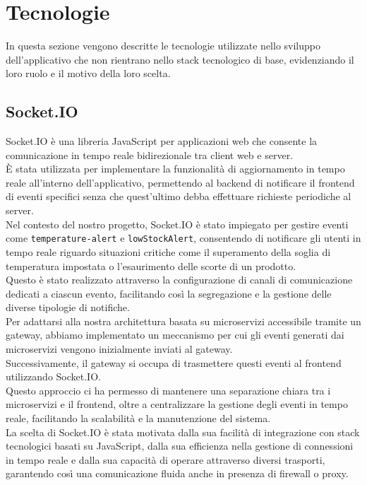 \section{Tecnologie}

In questa sezione vengono descritte le tecnologie utilizzate nello sviluppo dell'applicativo che non rientrano nello stack tecnologico di base, evidenziando il loro ruolo e il motivo della loro scelta.

\subsection{Socket.IO}
Socket.IO\cite{socketio} è una libreria JavaScript per applicazioni web che consente la comunicazione in tempo reale bidirezionale tra client web e server.\\
È stata utilizzata per implementare la funzionalità di aggiornamento in tempo reale all'interno dell'applicativo, permettendo al backend
di notificare il frontend di eventi specifici senza che quest'ultimo debba effettuare richieste periodiche al server.\\
Nel contesto del nostro progetto, Socket.IO è stato impiegato per gestire eventi come \texttt{temperature-alert} e \texttt{lowStockAlert},
consentendo di notificare gli utenti in tempo reale riguardo situazioni critiche come il superamento della soglia di temperatura impostata o l'esaurimento delle scorte di un prodotto.\\
Questo è stato realizzato attraverso la configurazione di canali di comunicazione dedicati a ciascun evento, facilitando così la segregazione e la gestione delle diverse tipologie di notifiche.\\
Per adattarsi alla nostra architettura basata su microservizi accessibile tramite un gateway, abbiamo implementato un
meccanismo per cui gli eventi generati dai microservizi vengono inizialmente inviati al gateway.\\
Successivamente, il gateway si occupa di trasmettere questi eventi al frontend utilizzando Socket.IO.\\
Questo approccio ci ha permesso di mantenere una separazione chiara tra i microservizi e il frontend, oltre a
centralizzare la gestione degli eventi in tempo reale, facilitando la scalabilità e la manutenzione del sistema.\\
La scelta di Socket.IO è stata motivata dalla sua facilità di integrazione con stack tecnologici basati su JavaScript,
dalla sua efficienza nella gestione di connessioni in tempo reale e dalla sua capacità di operare attraverso diversi trasporti,
garantendo così una comunicazione fluida anche in presenza di firewall o proxy.\\

